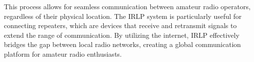 This process allows for seamless communication between amateur radio operators, regardless of their physical location. The IRLP system is particularly useful for connecting repeaters, which are devices that receive and retransmit signals to extend the range of communication. By utilizing the internet, IRLP effectively bridges the gap between local radio networks, creating a global communication platform for amateur radio enthusiasts.

